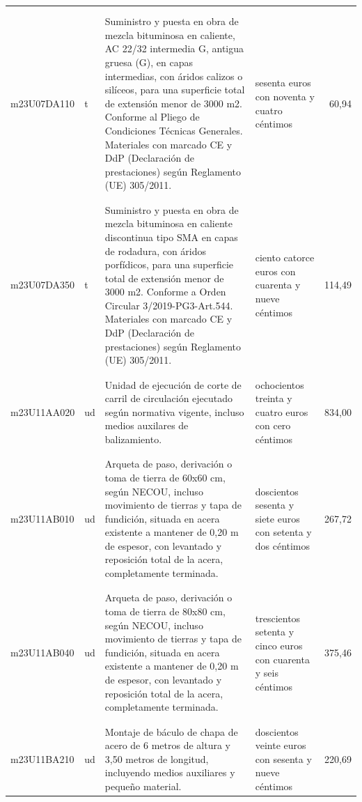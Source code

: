 \documentclass{book}%
\begin{document}
\begin{supertabular}{|l|l|p{5cm}|p{3cm}|r|}
&&&&\\%
&&&&\\%
m23U07DA110&t&Suministro y puesta en obra de mezcla bituminosa en caliente, AC 22/32 intermedia G, antigua gruesa (G), en capas intermedias, con áridos calizos o silíceos, para una superficie total de extensión menor de 3000 m2. Conforme al Pliego de Condiciones Técnicas Generales. Materiales con marcado CE y DdP (Declaración de prestaciones) según Reglamento (UE) 305/2011.&sesenta euros con noventa y cuatro céntimos&60,94\\%
&&&&\\%
&&&&\\%
m23U07DA350&t&Suministro y puesta en obra de mezcla bituminosa en caliente discontinua tipo SMA en capas de rodadura, con áridos porfídicos, para una superficie total de extensión menor de 3000 m2. Conforme a Orden Circular 3/2019{-}PG3{-}Art.544. Materiales con marcado CE y DdP (Declaración de prestaciones) según Reglamento (UE) 305/2011.&ciento catorce euros con cuarenta y nueve céntimos&114,49\\%
&&&&\\%
&&&&\\%
m23U11AA020&ud&Unidad de ejecución de corte de carril de circulación ejecutado según normativa vigente, incluso medios auxilares de balizamiento.&ochocientos treinta y cuatro euros con cero céntimos&834,00\\%
&&&&\\%
&&&&\\%
m23U11AB010&ud&Arqueta de paso, derivación o toma de tierra de 60x60 cm, según NECOU, incluso movimiento de tierras y tapa de fundición, situada en acera existente a mantener de 0,20 m de espesor, con levantado y reposición total de la acera, completamente terminada.&doscientos sesenta y siete euros con setenta y dos céntimos&267,72\\%
&&&&\\%
&&&&\\%
m23U11AB040&ud&Arqueta de paso, derivación o toma de tierra de 80x80 cm, según NECOU, incluso movimiento de tierras y tapa de fundición, situada en acera existente a mantener de 0,20 m de espesor, con levantado y reposición total de la acera, completamente terminada.&trescientos setenta y cinco euros con cuarenta y seis céntimos&375,46\\%
&&&&\\%
&&&&\\%
m23U11BA210&ud&Montaje de báculo de chapa de acero de 6 metros de altura y 3,50 metros de longitud, incluyendo medios auxiliares y pequeño material.&doscientos veinte euros con sesenta y nueve céntimos&220,69\\%

\end{supertabular}
\end{document}
